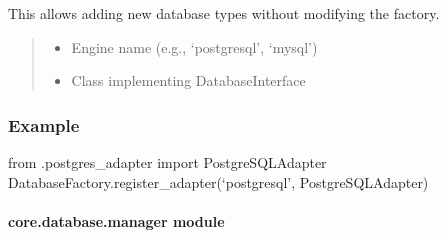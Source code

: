 \documentclass[letterpaper,10pt,english]{sphinxmanual}
\begin{document}
\begin{fulllineitems}
\begin{fulllineitems}
\sphinxAtStartPar
This allows adding new database types without modifying the factory.
\begin{quote}\begin{description}
\begin{itemize}
\item {} 
\sphinxAtStartPar
{} \textendash{} Engine name (e.g., ‘postgresql’, ‘mysql’)

\item {} 
\sphinxAtStartPar
{} \textendash{} Class implementing DatabaseInterface

\end{itemize}

\end{description}\end{quote}
\subsubsection*{Example}

\sphinxAtStartPar
from .postgres\_adapter import PostgreSQLAdapter
DatabaseFactory.register\_adapter(‘postgresql’, PostgreSQLAdapter)

\end{fulllineitems}


\end{fulllineitems}


\sphinxstepscope


\paragraph{core.database.manager module}
\label{\detokenize{core.database.manager:module-core.database.manager}}\label{\detokenize{core.database.manager:core-database-manager-module}}\label{\detokenize{core.database.manager::doc}}
\end{document}
